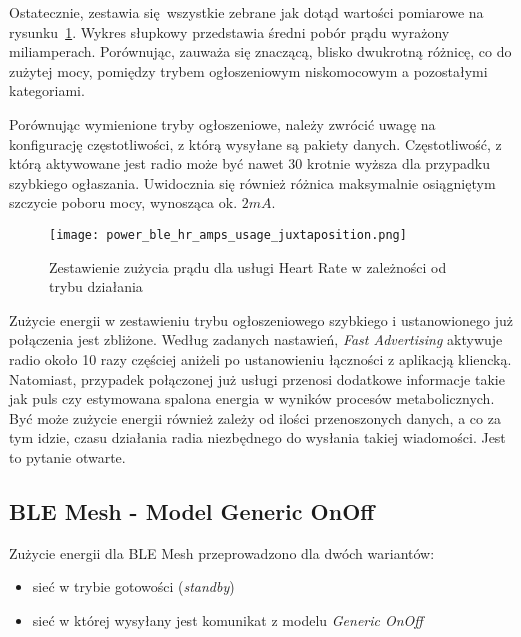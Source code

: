 Ostatecznie, zestawia się wszystkie zebrane jak dotąd wartości pomiarowe na rysunku~\ref{rys:power_ble_hr_amps_usage_juxtaposition}.
Wykres słupkowy przedstawia średni pobór prądu wyrażony miliamperach. Porównując, zauważa się znaczącą, blisko dwukrotną
różnicę, co do zużytej mocy, pomiędzy trybem ogłoszeniowym niskomocowym a pozostałymi kategoriami.

Porównując wymienione tryby ogłoszeniowe, należy zwrócić uwagę na konfigurację częstotliwości, z którą wysyłane są
pakiety danych. Częstotliwość, z którą aktywowane jest radio może być nawet 30 krotnie wyższa dla przypadku szybkiego ogłaszania.
Uwidocznia się również różnica maksymalnie osiągniętym szczycie poboru mocy, wynosząca ok. $2mA$.

\begin{figure}[!ht]
	\centering \texttt{[image: power\_ble\_hr\_amps\_usage\_juxtaposition.png]}
	\caption{Zestawienie zużycia prądu dla usługi Heart Rate w zależności od trybu działania}
	\label{rys:power_ble_hr_amps_usage_juxtaposition}
\end{figure}

Zużycie energii w zestawieniu trybu ogłoszeniowego szybkiego i ustanowionego już połączenia jest zbliżone. Według zadanych nastawień,
\textit{Fast Advertising} aktywuje radio około 10 razy częściej aniżeli po ustanowieniu łączności z aplikacją kliencką. Natomiast,
przypadek połączonej już usługi przenosi dodatkowe informacje takie jak puls czy estymowana spalona energia w wyników procesów
metabolicznych. Być może zużycie energii również zależy od ilości przenoszonych danych, a co za tym idzie, czasu działania radia
niezbędnego do wysłania takiej wiadomości. Jest to pytanie otwarte.

\subsection{BLE Mesh - Model Generic OnOff}

Zużycie energii dla \gls{BLE} Mesh przeprowadzono dla dwóch wariantów:
\begin{itemize}
\item sieć w trybie gotowości (\textit{standby})
\item sieć w której wysyłany jest komunikat z modelu \textit{Generic OnOff}
\end{itemize}


